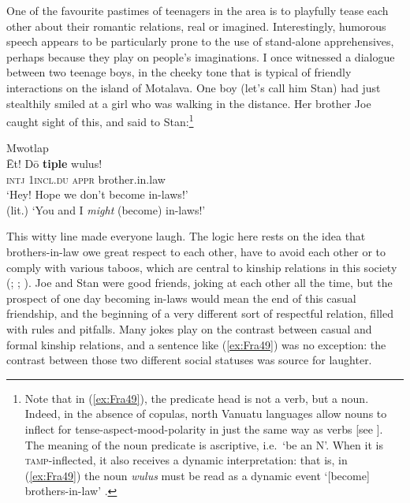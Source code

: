 \documentclass[output=paper,colorlinks,citecolor=brown]{langscibook}
\begin{document}
One of the favourite pastimes of teenagers in the area is to playfully tease each other about their romantic relations, real or imagined. Interestingly, humorous speech appears to be particularly prone to the use of stand-alone apprehensives, perhaps because they play on people's imaginations. I once witnessed a dialogue between two teenage boys, in the cheeky tone that is typical of friendly interactions on the island of Motalava. One boy (let's call him Stan) had just stealthily smiled at a girl who was walking in the distance. Her brother Joe caught sight of this, and said to Stan:\footnote{Note that in (\ref{ex:Fra49}), the predicate head is not a verb, but a noun. Indeed, in the absence of copulas, north Vanuatu languages allow nouns to inflect for tense-aspect-mood-polarity in just the same way as verbs [see ]. The meaning of the noun predicate is ascriptive, i.e.\ `be an N'. When it is \textsc{tamp-}inflected, it also receives a dynamic interpretation: that is, in (\ref{ex:Fra49}) the noun  \textit{wulus} must be read as a dynamic event `[become] brothers-in-law' \citep[1040]{Françoisforthcomingb}.}


\ea \label{ex:Fra49} \textnormal{Mwotlap} \francoissource{{[Mtp.AF-AP8-11b]}} \\
\gll Ēt! Dō \textbf{tiple} wulus! \\
\textsc{intj} \textsc{1incl.du} \textsc{appr} brother.in.law \\
\glt `Hey! Hope we don't become in-laws!' \\
(lit.) `You and I \textit{might} (become) in-laws!' \\
\z


\noindent This witty line made everyone laugh. The logic here rests on the idea that brothers-in-law owe great respect to each other, have to avoid each other or to comply with various taboos, which are central to kinship relations in this society (\citealt[43--45]{Codrington1891}; \citealt[12--14]{Malau2016}; \citealt[218]{Francois_tabu}). Joe and Stan were good friends, joking at each other all the time, but the prospect of one day becoming in-laws would mean the end of this casual friendship, and the beginning of a very different sort of respectful relation, filled with rules and pitfalls. Many jokes play on the contrast between casual and formal kinship relations, and a sentence like (\ref{ex:Fra49}) was no exception: the contrast between those two different social statuses was source for laughter.
\end{document}
